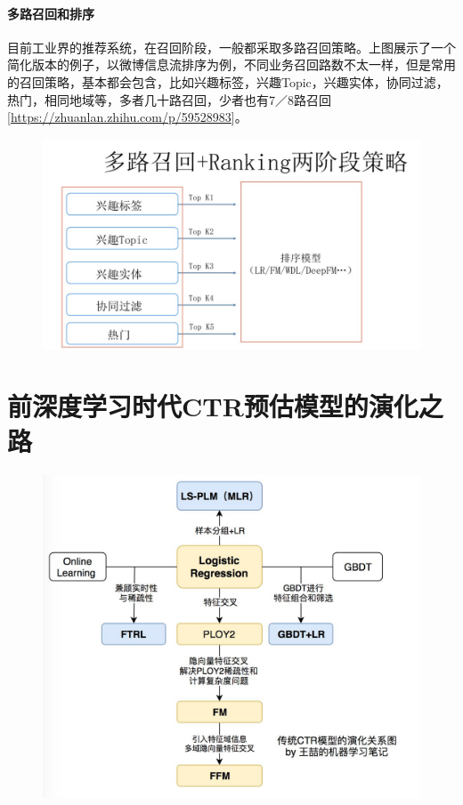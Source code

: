 \documentclass[12pt]{article}
\begin{document}
\subsection{多路召回和排序}
目前工业界的推荐系统，在召回阶段，一般都采取多路召回策略。上图展示了一个简化版本的例子，以微博信息流排序为例，不同业务召回路数不太一样，但是常用的召回策略，基本都会包含，比如兴趣标签，兴趣Topic，兴趣实体，协同过滤，热门，相同地域等，多者几十路召回，少者也有7／8路召回[\url{https://zhuanlan.zhihu.com/p/59528983}]。
\begin{figure}[H]
    \centering
    \includegraphics[width=.6\textwidth]{fig/Recall_Candidates_Multi_Methods_And_Rank.png}
\end{figure}


\part{前深度学习时代CTR预估模型的演化之路}
\begin{figure}[H]
    \centering
    \includegraphics[width=1\textwidth]{fig/Traditional_CTR_Model_Evolution.jpg}
\end{figure}
\end{document}
